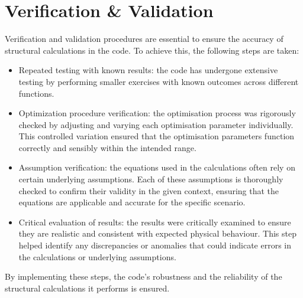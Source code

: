 \section{Verification \& Validation}
Verification and validation procedures are essential to ensure the accuracy of structural calculations in the code. To achieve this, the following steps are taken:
\begin{itemize}
    \item Repeated testing with known results: the code has undergone extensive testing by performing smaller exercises with known outcomes across different functions. 
    \item Optimization procedure verification: the optimisation process was rigorously checked by adjusting and varying each optimisation parameter individually. This controlled variation ensured that the optimisation parameters function correctly and sensibly within the intended range.
    \item Assumption verification: the equations used in the calculations often rely on certain underlying assumptions. Each of these assumptions is thoroughly checked to confirm their validity in the given context, ensuring that the equations are applicable and accurate for the specific scenario.
    \item Critical evaluation of results: the results were critically examined to ensure they are realistic and consistent with expected physical behaviour. This step helped identify any discrepancies or anomalies that could indicate errors in the calculations or underlying assumptions. 
\end{itemize}

By implementing these steps, the code’s robustness  and the reliability of the structural calculations it performs is ensured.


